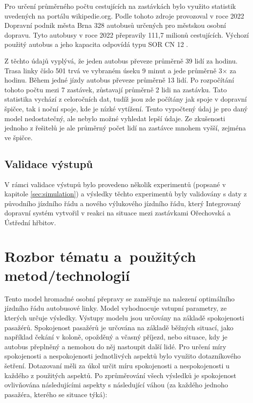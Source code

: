 \documentclass[a4paper]{article}
\begin{document}
            Pro určení průměrného počtu cestujících na zastávkách bylo využito statistik \cite{Pocet_cestujicich} uvedených na portálu wikipedie.org. Podle tohoto zdroje provozoval v roce 2022 Dopravní podnik města Brna 328 autobusů určených pro městskou osobní dopravu. Tyto autobusy v roce 2022 přepravily 111,7 milionů cestujících. Výchozí použitý autobus a jeho kapacita odpovídá typu SOR CN 12 \cite{PSOR_CN_12}.
            
            Z těchto údajů vyplývá, že jeden autobus převeze průměrně 39 lidí za hodinu. Trasa linky číslo 501 trvá ve vybraném úseku 9 minut a jede průměrně 3$\times$ za hodinu. Během jedné jízdy autobus převeze průměrně 13 lidí. 
            Po rozpočítání tohoto počtu mezi 7 zastávek, zůstavají průměrně 2 lidi na zastávku.
            Tato statistika vychází z celoročních dat, tudíž jsou zde počítány jak spoje v dopravní špičce, tak i noční spoje, kde je nízké vytížení. Tento vypočtený údaj je pro daný model nedostatečný, ale nebylo možné vyhledat lepší údaje. Ze zkušenosti jednoho z řešitelů je ale průměrný počet lidí na zastávce mnohem vyšší, zejména ve špičce.

        \subsection{Validace výstupů}
        \label{subsec:validation}
        V rámci validace výstupů bylo provedeno několik experimentů (popsané v kapitole \ref{sec:simulation}) a výsledky těchto experimentů byly validovány s daty z původního jízdního řádu a nového výlukového jízdního řádu, který Integrovaný dopravní systém vytvořil v reakci na situace mezi zastávkami Ořechovská a Ústřední hřbitov. 
	
\newpage
    \section{Rozbor tématu a~použitých metod/technologií}
    \label{sec:methods}
   		Tento model hromadné osobní přepravy se zaměřuje na nalezení optimálního jízdního řádu autobusové linky. Model vyhodnocuje vstupní parametry, ze kterých určuje výsledky. Výstupy modelu jsou určovány na základě spokojenosti pasažérů. Spokojenost pasažérů je určována na základě běžných situací, jako například čekání v koloně, opožděný a včasný příjezd, nebo situace, kdy je autobus přeplněný a nemohou do něj nastoupit další lidé. Pro určení míry spokojenosti a nespokojenosti jednotlivých aspektů bylo využito dotazníkového šetření. Dotazovaní měli za úkol určit míru spokojenosti a nespokojenosti u každého z použitých aspektů. Po zprůměrování všech výsledků je spokojenost ovlivňována následujícími aspekty s následující váhou (za každého jednoho pasažéra, kterého se situace týká): 
   		
\end{document}
